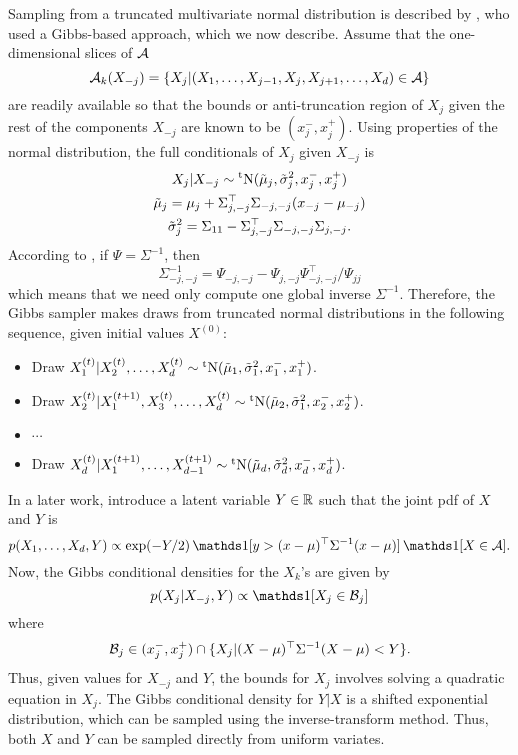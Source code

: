 Sampling from a truncated multivariate normal distribution is described by \citet{robert1995simulation}, who used a Gibbs-based approach, which we now describe.
Assume that the one-dimensional slices of ${\mathcal A}$ 
\[
  {\mathcal A}_k(X_{-j}) = \{X_j | (X_1,\dots,X_{j-1},X_j, X_{j+1},\dots,X_d) \in {\mathcal A} \}
\]
are readily available so that the bounds or anti-truncation region of $X_j$ given the rest of the components $X_{-j}$ are known to be $(x_j^-, x_j^+)$.
Using properties of the normal distribution, the full conditionals of $X_j$ given $X_{-j}$ is
\begin{gather*}
  X_j|X_{-j} \sim \operatorname{{}^tN}(\tilde\mu_j,\tilde\sigma_j^2, x_j^-, x_j^+) \\
  \tilde\mu_j = \mu_{j} + \Sigma_{j,-j}^\top\Sigma_{-j,-j}(x_{-j} - \mu_{-j}) \\
  \tilde\sigma_j^2 = \Sigma_{11} - \Sigma_{j,-j}^\top \Sigma_{-j,-j} \Sigma_{j,-j}.
\end{gather*}
According to \citet{robert1995simulation}, if $\Psi = \Sigma^{-1}$, then 
\[
  \Sigma_{-j,-j}^{-1} = \Psi_{-j,-j} - \Psi_{j,-j}\Psi_{-j,-j}^\top / \Psi_{jj}
\]
which means that we need only compute one global inverse $\Sigma^{-1}$.
Therefore, the Gibbs sampler makes draws from truncated normal distributions in the following sequence, given initial values $X^{(0)}$:
\begin{itemize}
  \item Draw $X^{(t)}_1|X^{(t)}_2,\dots,X^{(t)}_d \sim \operatorname{{}^tN}(\tilde\mu_1,\tilde\sigma_1^2, x_1^-, x_1^+)$.
  \item Draw $X^{(t)}_2|X^{(t+1)}_1,X^{(t)}_3,\dots,X^{(t)}_d \sim \operatorname{{}^tN}(\tilde\mu_2,\tilde\sigma_1^2, x_2^-, x_2^+)$.
  \item $\cdots$
  \item Draw $X^{(t)}_d|X^{(t+1)}_1,\dots,X^{(t+1)}_{d-1} \sim \operatorname{{}^tN}(\tilde\mu_d,\tilde\sigma_d^2, x_d^-, x_d^+)$.
\end{itemize}

In a later work, \citet{damien2001sampling} introduce a latent variable $Y \in \mathbb{R}$ such that the joint pdf of $X$ and $Y$ is
\[
  p(X_1,\dots,X_d,Y) \propto \exp(-Y/2) \ind[y > (x-\mu)^\top\Sigma^{-1}(x-\mu)]\ind[X\in\cA].
\]
Now, the Gibbs conditional densities for the $X_k$'s are given by
\[
  p(X_j|X_{-j},Y) \propto \ind[X_j \in \cB_j]
\]
where
\[
  {\mathcal B}_j \in (x_j^-, x_j^+) \cap \{X_j | (X-\mu)^\top\Sigma^{-1}(X-\mu) < Y \}.
\]
Thus, given values for $X_{-j}$ and $Y$, the bounds for $X_j$ involves solving a quadratic equation in $X_j$.
The Gibbs conditional density for $Y|X$ is a shifted exponential distribution, which can be sampled using the inverse-transform method.
Thus, both $X$ and $Y$ can be sampled directly from uniform variates.

